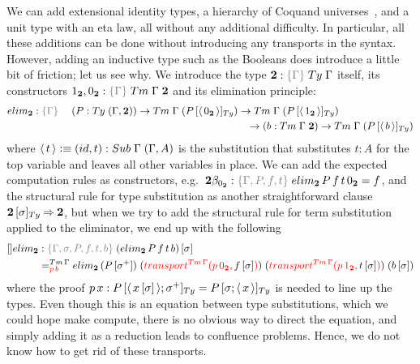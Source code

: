 \documentclass[a4paper,UKenglish,numberwithinsect,cleveref,thm-restate]{lipics-v2021}
\begin{document}
We can add extensional identity types, a hierarchy of Coquand universes~\cite{Coquand2018}, and a unit type with an eta law, all without any additional difficulty. In particular, all these additions can be done without introducing any transports in the syntax. However, adding an inductive type such as the Booleans does introduce a little bit of friction; let us see why.
We introduce the type $\bool : \implicit{\Gamma}\;\Ty\;\Gamma$ itself, its constructors $\btrue, \bfalse : \implicit{\Gamma}\;\Tm\;\Gamma\;\bool$ and its elimination principle:
%
\begin{alignat*}{3}
  \belim &: \implicit{\Gamma} \; && (P : \Ty\;(\Gamma , \bool)) \to \Tm\;\Gamma\;(\subTy{P}{\instSub{\bfalse}}) \to \Tm\;\Gamma\;(\subTy{P}{\instSub{\btrue}}) \\
  &&& \qquad\qquad\qquad\qquad\qquad\qquad\qquad\qquad\quad \to (b : \Tm\;\Gamma\;\bool) \to \Tm\;\Gamma\;(\subTy{P}{\instSub{b}})
\end{alignat*}
%
where $\instSub{t} \defeq (\idS, t) : \Sub\;\Gamma\;(\Gamma, A)$ is the substitution that substitutes $t : A$ for the top variable and leaves all other variables in place. We can add the expected computation rules 
%
%
as constructors, e.g.\ $ \bool\beta_{\bfalse} : \implicit{\Gamma, P, f, t}\; \belim\,P\,f\,t\,\bfalse = f$, and the structural rule for type substitution as another straightforward clause
$\subTy{\bool}{\sigma} \reduce \bool$,
but when we try to add the structural rule for term substitution applied to the eliminator, we end up with the following
%
\begin{alignat*}{5}
  []\belim & : \implicit{\Gamma, \sigma, P, f, t, b}\; \sub{(\belim\,P\,f\,t\,b)}{\sigma} \\
           & =^{\Tm\,\Gamma}_{\alert{p\,b}} \belim\,(\sub{P}{\sigma^+})\;(\alert{\transfib{\Tm\,\Gamma}{p\,\bfalse}{\textcolor{black}{\sub{f}{\sigma}}}})\;(\alert{\transfib{\Tm\,\Gamma}{p\,\btrue}{\textcolor{black}{\sub{t}{\sigma}}}})\; (\sub{b}{\sigma})
\end{alignat*}
where the proof $p\,x : \subTy{P}{\instSub{\sub{x}{\sigma}} ; \sigma^+} = \subTy{P}{\sigma ; \instSub{x}}$ is needed to line up the types. Even though this is an equation between type substitutions, which we could hope make compute, there is no obvious way to direct the equation, and simply adding it as a reduction leads to confluence problems. Hence, we do not know how to get rid of these transports.
\end{document}
